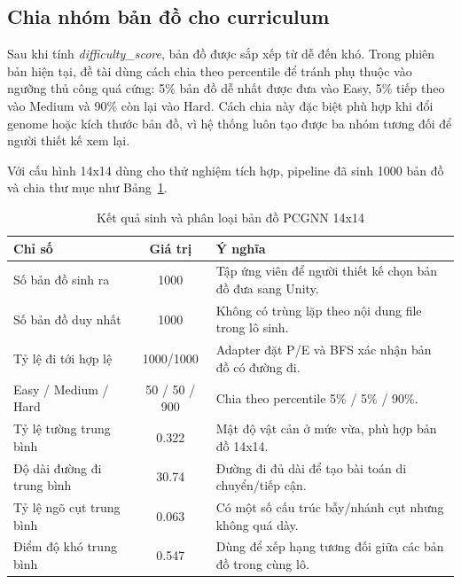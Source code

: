 \subsection{Chia nhóm bản đồ cho curriculum}

Sau khi tính \emph{difficulty\_score}, bản đồ được sắp xếp từ dễ đến khó. Trong phiên bản hiện tại, đề tài dùng cách chia theo percentile để tránh phụ thuộc vào ngưỡng thủ công quá cứng: 5\% bản đồ dễ nhất được đưa vào Easy, 5\% tiếp theo vào Medium và 90\% còn lại vào Hard. Cách chia này đặc biệt phù hợp khi đổi genome hoặc kích thước bản đồ, vì hệ thống luôn tạo được ba nhóm tương đối để người thiết kế xem lại.

Với cấu hình 14x14 dùng cho thử nghiệm tích hợp, pipeline đã sinh 1000 bản đồ và chia thư mục như Bảng~\ref{tab:pcgnn_map_generation_summary}.

\begin{table}[H]
    \centering
    \small
    \caption{Kết quả sinh và phân loại bản đồ PCGNN 14x14}
    \label{tab:pcgnn_map_generation_summary}
    \begin{tabular}{|p{5cm}|c|p{6.7cm}|}
        \hline
        \textbf{Chỉ số} & \textbf{Giá trị} & \textbf{Ý nghĩa} \\
        \hline
        Số bản đồ sinh ra & 1000 & Tập ứng viên để người thiết kế chọn bản đồ đưa sang Unity. \\
        \hline
        Số bản đồ duy nhất & 1000 & Không có trùng lặp theo nội dung file trong lô sinh. \\
        \hline
        Tỷ lệ đi tới hợp lệ & 1000/1000 & Adapter đặt P/E và BFS xác nhận bản đồ có đường đi. \\
        \hline
        Easy / Medium / Hard & 50 / 50 / 900 & Chia theo percentile 5\% / 5\% / 90\%. \\
        \hline
        Tỷ lệ tường trung bình & 0.322 & Mật độ vật cản ở mức vừa, phù hợp bản đồ 14x14. \\
        \hline
        Độ dài đường đi trung bình & 30.74 & Đường đi đủ dài để tạo bài toán di chuyển/tiếp cận. \\
        \hline
        Tỷ lệ ngõ cụt trung bình & 0.063 & Có một số cấu trúc bẫy/nhánh cụt nhưng không quá dày. \\
        \hline
        Điểm độ khó trung bình & 0.547 & Dùng để xếp hạng tương đối giữa các bản đồ trong cùng lô. \\
        \hline
    \end{tabular}
\end{table}

